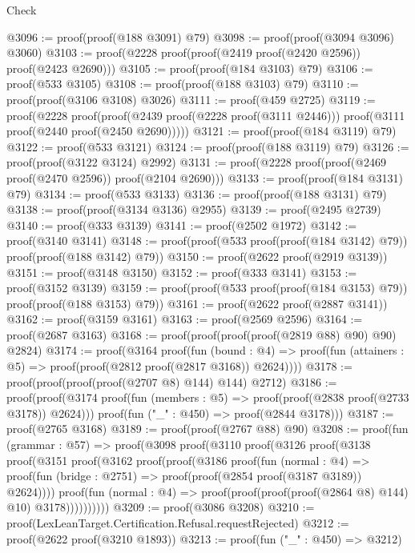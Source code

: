 \begin{lexlean}{Check}
\begin{coremodule}
@3096 := proof(proof(@188 @3091) @79)
@3098 := proof(proof(@3094 @3096) @3060)
@3103 := proof(@2228 proof(proof(@2419 proof(@2420 @2596)) proof(@2423 @2690)))
@3105 := proof(proof(@184 @3103) @79)
@3106 := proof(@533 @3105)
@3108 := proof(proof(@188 @3103) @79)
@3110 := proof(proof(@3106 @3108) @3026)
@3111 := proof(@459 @2725)
@3119 := proof(@2228
      proof(proof(@2439 proof(@2228 proof(@3111 @2446)))
          proof(@3111 proof(@2440 proof(@2450 @2690)))))
@3121 := proof(proof(@184 @3119) @79)
@3122 := proof(@533 @3121)
@3124 := proof(proof(@188 @3119) @79)
@3126 := proof(proof(@3122 @3124) @2992)
@3131 := proof(@2228 proof(proof(@2469 proof(@2470 @2596)) proof(@2104 @2690)))
@3133 := proof(proof(@184 @3131) @79)
@3134 := proof(@533 @3133)
@3136 := proof(proof(@188 @3131) @79)
@3138 := proof(proof(@3134 @3136) @2955)
@3139 := proof(@2495 @2739)
@3140 := proof(@333 @3139)
@3141 := proof(@2502 @1972)
@3142 := proof(@3140 @3141)
@3148 := proof(proof(@533 proof(proof(@184 @3142) @79)) proof(proof(@188 @3142) @79))
@3150 := proof(@2622 proof(@2919 @3139))
@3151 := proof(@3148 @3150)
@3152 := proof(@333 @3141)
@3153 := proof(@3152 @3139)
@3159 := proof(proof(@533 proof(proof(@184 @3153) @79)) proof(proof(@188 @3153) @79))
@3161 := proof(@2622 proof(@2887 @3141))
@3162 := proof(@3159 @3161)
@3163 := proof(@2569 @2596)
@3164 := proof(@2687 @3163)
@3168 := proof(proof(proof(proof(@2819 @88) @90) @90) @2824)
@3174 := proof(@3164
      proof(fun (bound : @4) =>
        proof(fun (attainers : @5) => proof(proof(@2812 proof(@2817 @3168)) @2624))))
@3178 := proof(proof(proof(proof(@2707 @8) @144) @144) @2712)
@3186 := proof(proof(@3174
        proof(fun (members : @5) => proof(proof(@2838 proof(@2733 @3178)) @2624)))
      proof(fun ("_" : @450) => proof(@2844 @3178)))
@3187 := proof(@2765 @3168)
@3189 := proof(proof(@2767 @88) @90)
@3208 := proof(fun (grammar : @57) =>
    proof(@3098
        proof(@3110
            proof(@3126
                proof(@3138
                    proof(@3151
                        proof(@3162
                            proof(proof(@3186
                                  proof(fun (normal : @4) =>
                                    proof(fun (bridge : @2751) =>
                                      proof(proof(@2854 proof(@3187 @3189)) @2624))))
                                proof(fun (normal : @4) =>
                                  proof(proof(proof(proof(@2864 @8) @144) @10) @3178))))))))))
@3209 := proof(@3086 @3208)
@3210 := proof(LexLeanTarget.Certification.Refusal.requestRejected)
@3212 := proof(@2622 proof(@3210 @1893))
@3213 := proof(fun ("_" : @450) => @3212)

\end{coremodule}
\end{lexlean}
